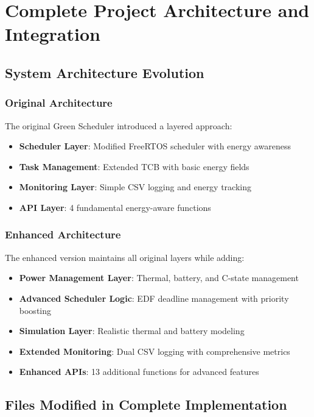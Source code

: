 \documentclass[11pt,a4paper]{article}
\begin{document}
\section{Complete Project Architecture and Integration}

\subsection{System Architecture Evolution}

\subsubsection{Original Architecture}
The original Green Scheduler introduced a layered approach:
\begin{itemize}
    \item \textbf{Scheduler Layer}: Modified FreeRTOS scheduler with energy awareness
    \item \textbf{Task Management}: Extended TCB with basic energy fields
    \item \textbf{Monitoring Layer}: Simple CSV logging and energy tracking
    \item \textbf{API Layer}: 4 fundamental energy-aware functions
\end{itemize}

\subsubsection{Enhanced Architecture}
The enhanced version maintains all original layers while adding:
\begin{itemize}
    \item \textbf{Power Management Layer}: Thermal, battery, and C-state management
    \item \textbf{Advanced Scheduler Logic}: EDF deadline management with priority boosting
    \item \textbf{Simulation Layer}: Realistic thermal and battery modeling
    \item \textbf{Extended Monitoring}: Dual CSV logging with comprehensive metrics
    \item \textbf{Enhanced APIs}: 13 additional functions for advanced features
\end{itemize}

\subsection{Files Modified in Complete Implementation}
\end{document}
